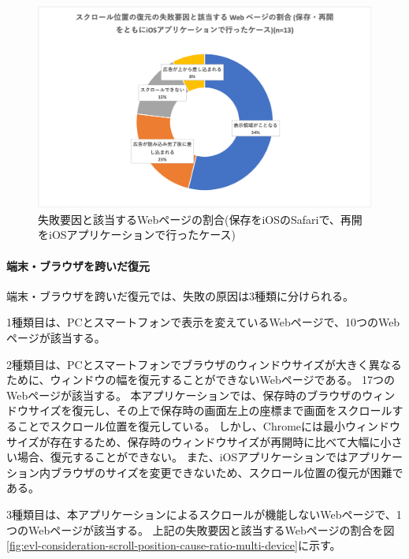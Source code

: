 \begin{figure}[htbp]
  \label{fig:evl-consideration-scroll-position-cause-ratio-ios}
  \begin{center}
    \includegraphics[bb=0 0 626.22222222 378.88888889,width=15cm]{img/060_evaluation/consideration/scroll_position/cause-ratio-ios.pdf}
  \end{center}
  \caption{失敗要因と該当するWebページの割合(保存をiOSのSafariで、再開をiOSアプリケーションで行ったケース)}
\end{figure}

\paragraph{端末・ブラウザを跨いだ復元}

端末・ブラウザを跨いだ復元では、失敗の原因は3種類に分けられる。

1種類目は、PCとスマートフォンで表示を変えているWebページで、10つのWebページが該当する。

2種類目は、PCとスマートフォンでブラウザのウィンドウサイズが大きく異なるために、ウィンドウの幅を復元することができないWebページである。
17つのWebページが該当する。
本アプリケーションでは、保存時のブラウザのウィンドウサイズを復元し、その上で保存時の画面左上の座標まで画面をスクロールすることでスクロール位置を復元している。
しかし、Chromeには最小ウィンドウサイズが存在するため、保存時のウィンドウサイズが再開時に比べて大幅に小さい場合、復元することができない。
また、iOSアプリケーションではアプリケーション内ブラウザのサイズを変更できないため、スクロール位置の復元が困難である。

3種類目は、本アプリケーションによるスクロールが機能しないWebページで、1つのWebページが該当する。
上記の失敗要因と該当するWebページの割合を図\ref{fig:evl-consideration-scroll-position-cause-ratio-multi-device}に示す。

